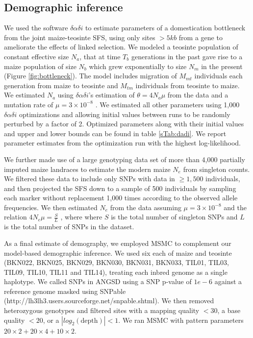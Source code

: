 \documentclass{pnastwo}
\begin{document}
\begin{article}
\begin{materials}
\subsection{Demographic inference}
We used the software $\delta\alpha\delta{i}$ \cite{gutenkunst2009} to estimate parameters of a domestication bottleneck from the joint maize-teosinte SFS, using only sites $>5 kb$ from a gene to ameliorate the effects of linked selection.
We modeled a teosinte population of constant effective size $N_a$, that at time $T_b$ generations in the past gave rise to a maize population of size $N_b$ which grew exponentially to size $N_m$ in the present (Figure \ref{fig:bottleneck}).
The model includes migration of $M_{mt}$ individuals each generation from maize to teosinte and $M_{tm}$ individuals from teosinte to maize.  We estimated $N_a$ using $\delta\alpha\delta{i}$'s estimation of $\theta=4N_a\mu$ from the data and a mutation rate of $\mu = 3 \times 10^{-8}$ \cite{clark2005}. 
We estimated all other parameters using 1,000 $\delta\alpha\delta{i}$ optimizations and allowing initial values between runs to be randomly perturbed by a factor of 2.  
Optimized parameters along with their initial values and upper and lower bounds can be found in table \ref{sTab:dadi}. We report parameter estimates from the optimization run with the highest log-likelihood.

We further made use of a large genotyping data set of more than 4,000 partially imputed maize landraces \cite{Hearne2015} to estimate the modern maize $N_e$ from singleton counts. 
We filtered these data to include only SNPs with data in $\geq 1,500$ individuals, and then projected the SFS down to a sample of 500 individuals by sampling each marker without replacement 1,000 times according to the observed allele frequencies.
We then estimated $N_e$ from the data assuming $\mu = 3 \times 10^{-8}$ \cite{clark2005} and the relation  $4N_e\mu = \frac{S}{L}$ \cite{fu1993}, where where $S$ is the total number of singleton SNPs and $L$ is the total number of SNPs in the dataset.

As a final estimate of demography, we employed MSMC \cite{schiffels2014}  to complement our model-based demographic inference. 
We used six each of maize and teosinte (BKN022, BKN025, BKN029, BKN030, BKN031, BKN033, TIL01, TIL03, TIL09, TIL10, TIL11 and TIL14), treating each inbred genome as a single haplotype.
We called SNPs in ANGSD \cite{korneliussen2014} using a SNP p-value of $1e-6$ against a reference genome masked using SNPable (http://lh3lh3.users.sourceforge.net/snpable.shtml). 
We then removed heterozygous genotypes and filtered sites with a mapping quality $<30$, a base quality $<20$, or a $|\textit{log}_2(\text{depth})|<1$.
We ran MSMC with pattern parameters $20\times2+20\times4+10\times2$.


\end{materials}
\end{article}
\end{document}
